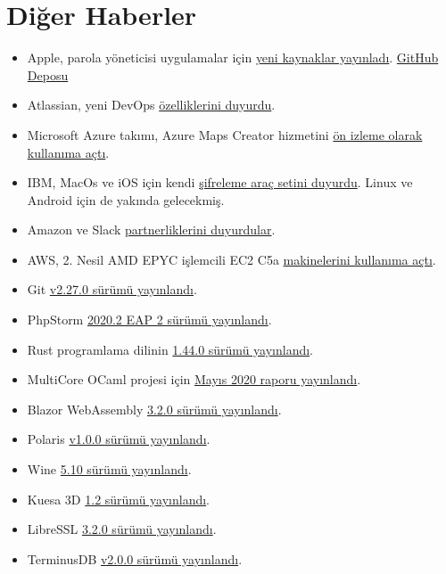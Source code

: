 \documentclass[11pt]{article}
\begin{document}
\section{Diğer Haberler}
\label{sec:orgfad05de}
\begin{itemize}
\item Apple, parola yöneticisi uygulamalar için \href{https://developer.apple.com/news/?id=06052020a\&1591373342}{yeni kaynaklar yayınladı}. \href{https://github.com/apple/password-manager-resources}{GitHub
Deposu}
\item Atlassian, yeni DevOps \href{https://techcrunch.com/2020/06/02/atlassian-launches-new-devops-features/}{özelliklerini duyurdu}.
\item Microsoft Azure takımı, Azure Maps Creator hizmetini \href{https://azure.microsoft.com/en-us/blog/azure-maps-creator-now-available-in-preview/}{ön izleme olarak
kullanıma açtı}.
\item IBM, MacOs ve iOS için kendi \href{https://www.ibm.com/blogs/research/2020/06/ibm-releases-fully-homomorphic-encryption-toolkit-for-macos-and-ios-linux-and-android-coming-soon/}{şifreleme araç setini duyurdu}. Linux ve Android
için de yakında gelecekmiş.
\item Amazon ve Slack \href{https://www.theverge.com/2020/6/4/21280829/slack-amazon-aws-partnership-amazon-chime-voice-video-calls}{partnerliklerini duyurdular}.
\item AWS, 2. Nesil AMD EPYC işlemcili EC2 C5a \href{https://aws.amazon.com/blogs/aws/new-amazon-ec2-c5a-instances-powered-by-2nd-gen-amd-epyc-processors/}{makinelerini kullanıma açtı}.
\item Git \href{https://lore.kernel.org/git/xmqqzh9mu4my.fsf@gitster.c.googlers.com/}{v2.27.0 sürümü yayınlandı}.
\item PhpStorm \href{https://blog.jetbrains.com/phpstorm/2020/06/phpstorm-2020-2-eap-2/}{2020.2 EAP 2 sürümü yayınlandı}.
\item Rust programlama dilinin \href{https://blog.rust-lang.org/2020/06/04/Rust-1.44.0.html}{1.44.0 sürümü yayınlandı}.
\item MultiCore OCaml projesi için \href{https://discuss.ocaml.org/t/multicore-ocaml-may-2020-update/5898}{Mayıs 2020 raporu yayınlandı}.
\item Blazor WebAssembly \href{https://www.hiddenbrains.com/blog/blazor-webassembly-3-2-0-released.html}{3.2.0 sürümü yayınlandı}.
\item Polaris \href{https://www.fairwinds.com/blog/fairwinds-polaris-1.0-best-practices-for-kubernetes-workloads}{v1.0.0 sürümü yayınlandı}.
\item Wine \href{https://www.winehq.org/announce/5.10}{5.10 sürümü yayınlandı}.
\item Kuesa 3D \href{https://www.kdab.com/kuesa-3d-1-2-release/}{1.2 sürümü yayınlandı}.
\item LibreSSL \href{https://ftp.openbsd.org/pub/OpenBSD/LibreSSL/libressl-3.2.0-relnotes.txt}{3.2.0 sürümü yayınlandı}.
\item TerminusDB \href{https://github.com/terminusdb/terminusdb-server/releases/tag/v2.0.0}{v2.0.0 sürümü yayınlandı}.
\end{itemize}
\end{document}
